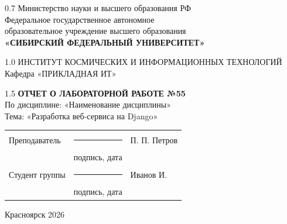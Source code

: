 \begin{titlepage}
	\begin{center}
		\begin{spacing}{0.7}
		Министерство науки и высшего образования РФ\\
		{\small Федеральное государственное автономное}\\
		{\small образовательное учреждение высшего образования}\\
		\textbf{\small«СИБИРСКИЙ ФЕДЕРАЛЬНЫЙ УНИВЕРСИТЕТ»}\\
		\end{spacing}
		
		\vfill
		
		\begin{spacing}{1.0}
		ИНСТИТУТ КОСМИЧЕСКИХ И ИНФОРМАЦИОННЫХ ТЕХНОЛОГИЙ\\
		Кафедра «ПРИКЛАДНАЯ ИТ»\\
		\end{spacing}
		
		\vfill
		\vfill
		
		\begin{spacing}{1.5}
			\textbf{\large ОТЧЕТ О ЛАБОРАТОРНОЙ РАБОТЕ №55}\\[5mm]
			По дисциплине: «Наименование дисциплины»\\[3mm]
			Тема: «Разработка веб-сервиса на Django»
		\end{spacing}
    \end{center}		

	\vfill
	\vfill
	
\noindent
\begin{tabular}{@{} p{} p{} p{} @{}}
	Преподаватель    & \rule{3.5cm}{.1pt} & П. П. Петров \\
	                 & {\scriptsize подпись, дата} & \\ [4ex]
	Студент группы   & \rule{3.5cm}{.1pt} & Иванов И. \\
	 & {\scriptsize подпись, дата} & \\
\end{tabular}

\vfill
\begin{center}Красноярск 2026\end{center}
\end{titlepage}
\restoregeometry
